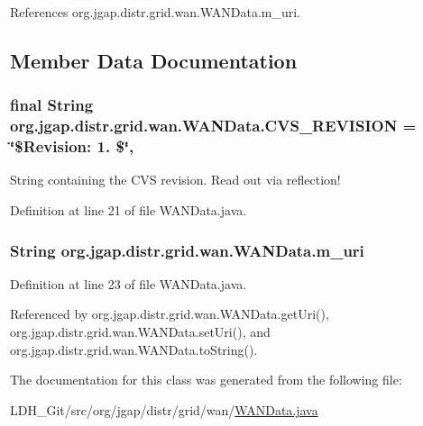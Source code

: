 References org.\-jgap.\-distr.\-grid.\-wan.\-W\-A\-N\-Data.\-m\-\_\-uri.



\subsection{Member Data Documentation}
\hypertarget{classorg_1_1jgap_1_1distr_1_1grid_1_1wan_1_1_w_a_n_data_a272e851b0485552abf0d14de2ea0e0bf}{
\subsubsection[{C\-V\-S\-\_\-\-R\-E\-V\-I\-S\-I\-O\-N}]{\setlength{\rightskip}{0pt plus 5cm}final String org.\-jgap.\-distr.\-grid.\-wan.\-W\-A\-N\-Data.\-C\-V\-S\-\_\-\-R\-E\-V\-I\-S\-I\-O\-N = \char`\"{}\$Revision\-: 1. \$\char`\"{}\hspace{0.3cm}{\ttfamily [static]}, {\ttfamily [private]}}}\label{classorg_1_1jgap_1_1distr_1_1grid_1_1wan_1_1_w_a_n_data_a272e851b0485552abf0d14de2ea0e0bf}
String containing the C\-V\-S revision. Read out via reflection! 

Definition at line 21 of file W\-A\-N\-Data.\-java.

\hypertarget{classorg_1_1jgap_1_1distr_1_1grid_1_1wan_1_1_w_a_n_data_af084d83b22c01740477ac4210859454d}{
\subsubsection[{m\-\_\-uri}]{\setlength{\rightskip}{0pt plus 5cm}String org.\-jgap.\-distr.\-grid.\-wan.\-W\-A\-N\-Data.\-m\-\_\-uri\hspace{0.3cm}{\ttfamily [private]}}}\label{classorg_1_1jgap_1_1distr_1_1grid_1_1wan_1_1_w_a_n_data_af084d83b22c01740477ac4210859454d}


Definition at line 23 of file W\-A\-N\-Data.\-java.



Referenced by org.\-jgap.\-distr.\-grid.\-wan.\-W\-A\-N\-Data.\-get\-Uri(), org.\-jgap.\-distr.\-grid.\-wan.\-W\-A\-N\-Data.\-set\-Uri(), and org.\-jgap.\-distr.\-grid.\-wan.\-W\-A\-N\-Data.\-to\-String().



The documentation for this class was generated from the following file\-:\begin{DoxyCompactItemize}
\item 
L\-D\-H\-\_\-\-Git/src/org/jgap/distr/grid/wan/\hyperlink{_w_a_n_data_8java}{W\-A\-N\-Data.\-java}\end{DoxyCompactItemize}
